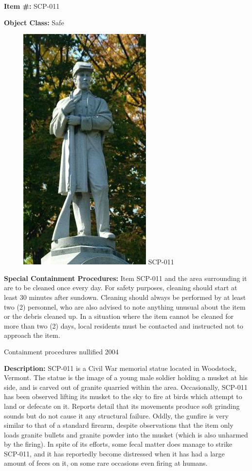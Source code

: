
\textbf{Item \#:} SCP-011

\textbf{Object Class:} Safe

\begin{figure}[h]
\begin{center}
\includegraphics[scale=0.6]{scp/011.jpg}
\linebreak SCP-011
\end{center}
\end{figure}

\textbf{Special Containment Procedures:} Item SCP-011 and the area surrounding it are to be cleaned once every day. For safety purposes, cleaning should start at least 30 minutes after sundown. Cleaning should always be performed by at least two (2) personnel, who are also advised to note anything unusual about the item or the debris cleaned up. In a situation where the item cannot be cleaned for more than two (2) days, local residents must be contacted and instructed not to approach the item.

\lb Containment procedures nullified 2004\rb

\textbf{Description:} SCP-011 is a Civil War memorial statue located in Woodstock, Vermont. The statue is the image of a young male soldier holding a musket at his side, and is carved out of granite quarried within the area. Occasionally, SCP-011 has been observed lifting its musket to the sky to fire at birds which attempt to land or defecate on it. Reports detail that its movements produce soft grinding sounds but do not cause it any structural failure. Oddly, the gunfire is very similar to that of a standard firearm, despite observations that the item only loads granite bullets and granite powder into the musket (which is also unharmed by the firing). In spite of its efforts, some fecal matter does manage to strike SCP-011, and it has reportedly become distressed when it has had a large amount of feces on it, on some rare occasions even firing at humans.

